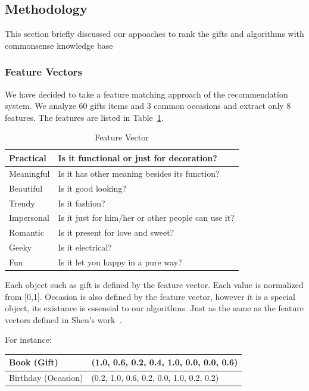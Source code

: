 \documentclass[11pt,twocolumn]{article}
\begin{document}
\subsection{Methodology}

This section briefly discussed our appoaches to rank the gifts and algorithms with commonsense knowledge base

\subsubsection{Feature Vectors}

We have decided to take a feature matching approach of the recommendation system.
We analyze 60 gifts items and 3 common occasions and extract only 8 features.  
The features are listed in Table~\ref{features}.


\begin{table}[ht]
\caption{Feature Vector}
\centering
\begin{tabular}{l l}
\hline
Practical & Is it functional or just for decoration? \\
\hline
Meaningful & Is it has other meaning besides its function? \\
\hline
Beautiful & Is it good looking? \\
\hline
Trendy & Is it fashion? \\
\hline
Impersonal & Is it just for him/her or other people can use it? \\
\hline
Romantic & Is it present for love and sweet? \\
\hline
Geeky & Is it electrical? \\
\hline
Fun & Is it let you happy in a pure way? \\
\end{tabular}
\label{features}
\end{table}


Each object such as gift is defined by the feature vector. Each value is normalized from [0,1].
Occasion is also defined by the feature vector, however it is a special object, its existance
is essensial to our algorithms. Just as the same as the feature vectors defined in Shen's work~\cite{Shen}.

\noindent For instance: 


\noindent \begin{tabular}{| l | l |}
\hline
Book (Gift) & (1.0, 0.6, 0.2, 0.4, 1.0, 0.0, 0.0, 0.6) \\
\hline
Birthday (Occasion) & (0.2, 1.0, 0.6, 0.2, 0.0, 1.0, 0.2, 0.2) \\
\hline
\end{tabular}
\end{document}
